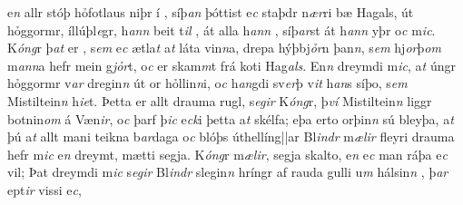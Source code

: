 e\textit{n} allr   stóþ hỏfotlaus niþr í  ,  síþ\textit{an} þóttist e\textit{c} staþdr n\textit{ær}ri bæ
Hagals,   út  hỏggormr,   íllúþl\textit{e}gr, h\textit{ann} beit   t\textit{il} ,   át   alla   h\textit{ann} , síþ\textit{ar}st át h\textit{ann} yþr o\textit{c}
m\textit{ic}. K\textit{óng}r   þ\textit{at} er  , s\textit{em} e\textit{c}  ætla\textit{t} a\textit{t} láta vin\textit{n}a,   drepa hýþbj\textit{ỏr}n þan\textit{n},  s\textit{em}
hj\textit{or}þ\textit{om} m\textit{ann}a hefr   mein g\textit{jỏr}t, o\textit{c} er skam\textit{m}t frá  koti
Hag\textit{als}.  En\textit{n} dreymdi m\textit{ic},   a\textit{t} úngr hỏggormr v\textit{ar} dregin\textit{n} út or hỏllin\textit{n}i, o\textit{c} h\textit{an}gdi sv\textit{er}þ v\textit{it} h\textit{an}s  síþo, s\textit{em} Mistiltein\textit{n} h\textit{ie}t.  
Þetta er allt drauma rugl,  s\textit{egir}
K\textit{óng}r, þ\textit{ví} Mistiltein\textit{n} liggr   botnin\textit{om} á Væn\textit{ir}, o\textit{c} þarf 
þ\textit{ic} e\textit{ck}i þetta a\textit{t} skélfa; eþa erto
orþin\textit{n} sú bleyþa, a\textit{t} þú  a\textit{t} allt mani teikna b\textit{ar}daga o\textit{c} blóþs
úthellíng||ar 
Bl\textit{indr} m\textit{ælir} fleyri drauma
hefr m\textit{ic} e\textit{n} dreymt, mætti   segja. K\textit{óng}r m\textit{ælir}, segja skalto, e\textit{n}
e\textit{c} man ráþa   e\textit{c} vil; 
Þat  dreymdi m\textit{ic} s\textit{egir}
Bl\textit{indr}  slegin\textit{n}  hríngr af rauda gulli   u\textit{m} hálsin\textit{n} , þ\textit{ar} ept\textit{ir} vissi e\textit{c},  
